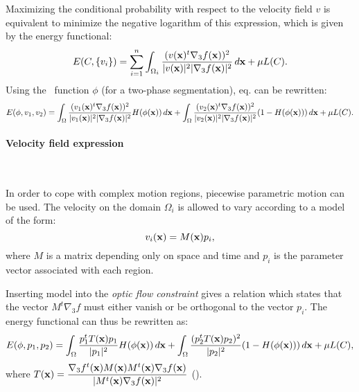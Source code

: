 Maximizing the conditional probability  with respect to the velocity field $v$ is equivalent to minimize the negative logarithm of this expression, which is given by the energy functional:
\begin{equation}
  \label{eq:NRJ_C_cremers2005}
  E(C,\lbrace v_i \rbrace) = \sum_{i=1}^n {\int_{\Omega_i} \frac{( v(\mathbf{x})^t \nabla_3 f(\mathbf{x}) )^2}{ |v(\mathbf{x})|^2 |\nabla_3 f(\mathbf{x})|^2} \, d\mathbf{x} + \mu L(C) }.
\end{equation}
Using the \ls~function $\phi$ (for a two-phase segmentation), eq. can be rewritten:
\begin{equation}
  \label{eq:NRJ_phi_cremers2005}
  E(\phi,v_1, v_2) = \int_\Omega \frac{( v_1(\mathbf{x})^t \nabla_3 f(\mathbf{x}) )^2}{ |v_1(\mathbf{x})|^2 |\nabla_3 f(\mathbf{x})|^2} H(\phi(\mathbf{x})) \, d\mathbf{x} + \int_\Omega \frac{( v_2(\mathbf{x})^t \nabla_3 f(\mathbf{x}) )^2}{ |v_2(\mathbf{x})|^2 |\nabla_3 f(\mathbf{x})|^2} (1-H(\phi(\mathbf{x}))) \, d\mathbf{x} + \mu L(C).
\end{equation}


\paragraph{Velocity field expression}
~\par \vspace{0.3cm}
In order to cope with complex motion regions, piecewise parametric motion can be used. The velocity on the domain $\Omega_i$ is allowed to vary according to a model of the form:
\begin{equation}
  \label{eq:v-model_cremers2005}
  v_i(\mathbf{x}) = M(\mathbf{x})p_i,
\end{equation}
where $M$ is a matrix depending only on space and time and $p_i$ is the parameter vector associated with each region.

Inserting model  into the \emph{optic flow constraint}  gives a relation which states that the vector $M^t \nabla_3 f$ must either vanish or be orthogonal to the vector $p_i$. The energy functional can thus be rewritten as:
\begin{equation}
  \label{eq:NRJ2_phi_cremers2005}
  E(\phi,p_1, p_2) = \int_\Omega \frac{p_1^t T(\mathbf{x})p_1}{|p_1|^2} H(\phi(\mathbf{x})) \, d\mathbf{x} + \int_\Omega \frac{( p_2^t T(\mathbf{x})p_2 )^2}{|p_2|^2} (1-H(\phi(\mathbf{x}))) \, d\mathbf{x} + \mu L(C),
\end{equation}
where $T(\mathbf{x}) = \dfrac{ \nabla_3 f^t(\mathbf{x}) M(\mathbf{x}) M^t(\mathbf{x}) \nabla_3 f(\mathbf{x}) }{ |M^t(\mathbf{x}) \nabla_3 f(\mathbf{x})|^2 }$ ().


